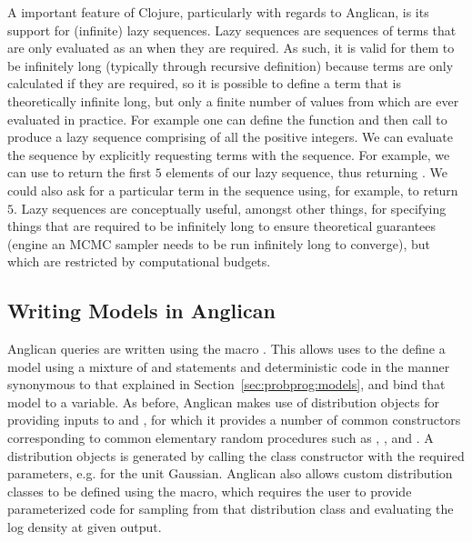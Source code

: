 A important feature of Clojure, particularly with regards to Anglican, is its support for (infinite) lazy sequences.
Lazy sequences are sequences of terms that are only evaluated as an when they are required.  As such, it is 
valid for them to be infinitely long (typically through recursive definition) because terms are only calculated if
they are required, so it is possible to define a term that is theoretically infinite long, but only a finite number
of values from which are ever evaluated in practice.    For example one can define the function
 {\small {}} and then call {\small {}} to produce a
lazy sequence comprising of all the positive integers.  We can evaluate the sequence by explicitly requesting
terms with the sequence.  For example, we can use {\small {}} to return the first $5$ elements
of our lazy sequence, thus returning {\small {}}.  We could also ask for a particular term in the
sequence using, for example, {\small {}} to return $5$.
Lazy sequences are conceptually useful, amongst other things, for specifying things that
are required to be infinitely long to ensure theoretical guarantees (engine an MCMC sampler needs to be run
infinitely long to converge), but which are restricted by computational budgets.

\subsection{Writing Models in Anglican}
\label{sec:probprog:anglican:models} 

Anglican queries are written using the macro .  This allows uses to the define a model using a mixture
of \sample and \observe statements and deterministic code in the manner synonymous to that explained in
Section~\ref{sec:probprog:models}, and bind that model to a variable.  
As before, Anglican makes use of distribution objects for providing inputs to \sample and \observe, for which
it provides a number of common constructors corresponding to common
elementary random procedures such
as \gammaa, \normal, and \betaa.  A distribution objects is generated by calling the class constructor
with the required parameters, e.g. {\small {}} for the unit Gaussian.
Anglican also allows custom distribution classes to be defined using
the  macro, which requires the user to provide parameterized code for sampling from that distribution
class and evaluating the log density at given output.

